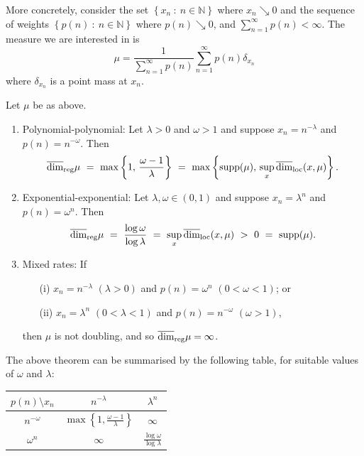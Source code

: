 More concretely, consider the set $\left\{ x_n \ : \ n \in \mathbb{N}\right\}$ where  $x_n  \searrow 0$ and the sequence of weights $\left\{ p(n) \ : \ n \in \mathbb{N} \right\}$ where $p(n) \searrow 0$, and $\sum_{n=1}^\infty p(n) < \infty$.  The measure we are interested in is
\[
\mu = \frac{1}{\sum_{n=1}^\infty p(n) } \sum_{n=1}^\infty p(n)\delta_{x_n} 
\]
where $\delta_{x_n} $ is a point mass at $x_n$.

\begin{theorem}\label{ch-upper-reg:sequences}
	Let $\mu$ be as above.
	\begin{enumerate}
		\item Polynomial-polynomial: Let $\lambda > 0$ and $\omega > 1$ and suppose $x_n = n^{-\lambda}$ and $p(n)=n^{-\omega}$.  Then
		\[
		\overline{\dim}_{\textup{reg}} \mu \ = \  \max \left\{1, \, \frac{\omega-1}{\lambda}\right\} \  =\  \max \left\{ \textup{supp} (\mu), \, \sup_x \overline{\dim}_{\textrm{loc}}(x,\mu)\right\}.
		\]
		\item Exponential-exponential: Let $\lambda, \omega \in (0,1)$ and suppose $x_n= \lambda^{n}$ and $p(n)=\omega^{n}$.  Then
		\[
		\r \ = \  \frac{\log \omega}{\log \lambda}  \ = \ \sup_x \overline{\dim}_{\textup{loc}}(x,\mu) \ >  \     0 \ = \ \textup{supp} (\mu) .
		\]
		\item Mixed rates: If
		\begin{enumerate}
			\item[(i)] $x_n = n^{-\lambda}$ $(\lambda >0)$ and $p(n)=\omega^{n}$ $(0< \omega < 1)$; or
			\item[(ii)]  $x_n =  \lambda^{n}$ $(0< \lambda < 1)$ and $p(n)=n^{-\omega}$ $(\omega >1)$,
		\end{enumerate}
		then $\mu$ is not doubling, and so  $\overline{\dim}_{\textup{reg}} \mu = \infty$.
	\end{enumerate}
\end{theorem}


The above theorem can be summarised by the following table, for suitable values of $\omega$ and $\lambda$:


\begin{table}[h]
	\centering
	\label{ch-upper-reg:sequencetable}
	\begin{tabular}{c|cc}
		$p(n) \setminus x_n$ & $n^{-\lambda}$             & $\lambda^n$                        \\ \hline
		$n^{-\omega}$       & $\max \left\{1,\frac{\omega - 1}{\lambda}\right\}$ & $\infty$\\
		$\omega^n$          & $\infty$                         & $\frac{\log \omega}{\log \lambda}$
	\end{tabular}
\end{table}

